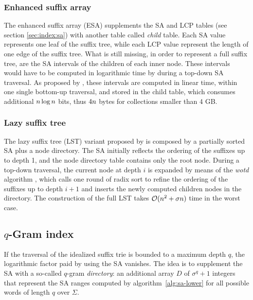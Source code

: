 \subsubsection{Enhanced suffix array}
\label{sec:index:esa}

The enhanced suffix array (ESA) \citep{Abouelhoda2004} supplements the SA and LCP tables (see section \ref{sec:index:sa}) with another table called \emph{child} table.
Each SA value represents one leaf of the suffix tree, while each LCP value represent the length of one edge of the suffix tree.
What is still missing, in order to represent a full suffix tree, are the SA intervals of the children of each inner node.
These intervals would have to be computed in logarithmic time by  during a top-down SA traversal.
As proposed by \cite{Abouelhoda2004}, these intervals are computed in linear time, within one single bottom-up traversal, and stored in the child table, which consumes additional $n \log n$ bits, thus $4n$ bytes for collections smaller than 4 GB.

\subsubsection{Lazy suffix tree}
\label{sec:index:lst}

The lazy suffix tree (LST) \citep{Giegerich1999} variant proposed by \citep{Weese2013} is composed by a partially sorted SA plus a node directory.
The SA initially reflects the ordering of the suffixes up to depth 1, and the node directory table contains only the root node.
During a top-down traversal, the current node at depth $i$ is expanded by means of the \emph{wotd} algorithm \citep{Giegerich1999}, which calls one round of radix sort to refine the ordering of the suffixes up to depth $i + 1$ and inserts the newly computed children nodes in the directory.
The construction of the full LST takes $\mathcal{O}(n^2 + \sigma n)$ time in the worst case.

\subsection{$q$-Gram index}
\label{sec:index:qgram}

If the traversal of the idealized suffix trie is bounded to a maximum depth $q$, the logarithmic factor paid by using the SA vanishes.
The idea is to supplement the SA with a so-called $q$-gram \emph{directory}: an additional array $D$ of $\sigma^q + 1$ integers that represent the SA ranges computed by algorithm~\ref{alg:sa-lower} for all possible words of length $q$ over $\Sigma$.

